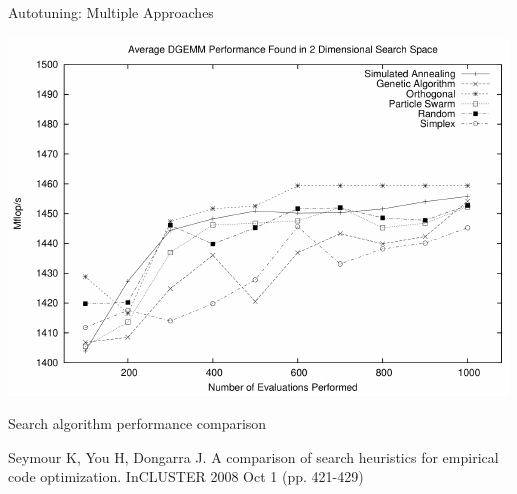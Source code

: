 \documentclass[10pt, compress, aspectratio=169, xcolor={table,usenames,dvipsnames}]{beamer}
\begin{document}
\begin{frame}[label={sec:org899d006}]{Autotuning: Multiple Approaches}
\begin{center}
\begin{center}
\includegraphics[width=.58\linewidth]{../img/seymour2008comparison_algorithms.pdf}
\end{center}

\vspace{-.2cm}

Search algorithm \alert{performance} comparison

\scriptsize{Seymour K, You H, Dongarra J. A comparison of search heuristics for empirical code optimization. InCLUSTER 2008 Oct 1 (pp. 421-429)}
\end{center}
\end{frame}
\end{document}
